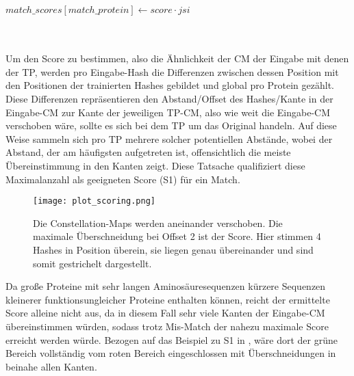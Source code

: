 \begin{enumerate}[a)]
\begin{minipage}{\Width}
\begin{algorithm}[H]
\begin{algorithmic}[1]
                                \State $match\_scores[match\_protein] \gets score \cdot jsi$
                            \EndFor
                        \end{algorithmic}
                    \end{algorithm}
                \end{minipage}\hfill\\\hfill\\

                Um den Score zu bestimmen, also die Ähnlichkeit der \ac{CM} der Eingabe mit denen der \ac{TP}, werden pro Eingabe-Hash die Differenzen zwischen dessen Position mit den Positionen der trainierten Hashes gebildet und global pro Protein gezählt. Diese Differenzen repräsentieren den Abstand/Offset des Hashes/Kante in der Eingabe-\acs{CM} zur Kante der jeweiligen \ac{TP}-\acs{CM}, also wie weit die Eingabe-\acs{CM} verschoben wäre, sollte es sich bei dem \ac{TP} um das Original handeln. Auf diese Weise sammeln sich pro \ac{TP} mehrere solcher potentiellen Abstände, wobei der Abstand, der am häufigsten aufgetreten ist, offensichtlich die meiste Übereinstimmung in den Kanten zeigt. Diese Tatsache qualifiziert diese Maximalanzahl als geeigneten Score (S1) für ein Match.

                \begin{minipage}{\Width}
                \begin{figure}[H]
                    \centering
                    \texttt{[image: plot\_scoring.png]}
                    \caption[Ermittlung des S1-Score]{Die Constellation-Maps werden aneinander verschoben. Die maximale Überschneidung bei Offset 2 ist der Score. Hier stimmen 4 Hashes in Position überein, sie liegen genau übereinander und sind somit gestrichelt dargestellt.}
                    \label{fig:scoring}
                \end{figure}
                \end{minipage}

                Da große Proteine mit sehr langen Aminosäuresequenzen kürzere Sequenzen kleinerer funktionsungleicher Proteine enthalten können, reicht der ermittelte Score alleine nicht aus, da in diesem Fall sehr viele Kanten der Eingabe-\ac{CM} übereinstimmen würden, sodass trotz Mis-Match der nahezu maximale Score erreicht werden würde. Bezogen auf das Beispiel zu S1 in , wäre dort der grüne Bereich vollständig vom roten Bereich eingeschlossen mit Überschneidungen in beinahe allen Kanten.


\end{enumerate}
